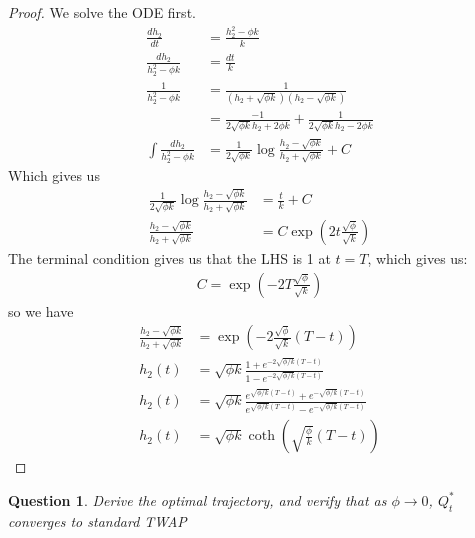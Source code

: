 \documentclass{amsart}
\newtheorem{theorem}{Question}[section]
\begin{document}
\begin{proof}
    We solve the ODE first.
    \begin{align*}
        \frac{dh_2}{dt} &= \frac{h_2^2 - \phi k}{k} \\
        \frac{dh_2}{h_2^2 - \phi k} &= \frac{dt}{k} \\
        \frac{1}{h_2^2 - \phi k} &= \frac1{(h_2 + \sqrt{\phi k})(h_2 - \sqrt{\phi k})} \\
        &= \frac{-1}{2\sqrt{\phi k} h_2 + 2\phi k}  + \frac{1}{2\sqrt{\phi k} h_2 - 2 \phi k} \\
        \int \frac{d h_2}{h_2^2 - \phi k} &= \frac{1}{2\sqrt{\phi k}} \log\frac{h_2 - \sqrt{\phi k}}{h_2 + \sqrt{\phi k}} + C 
    \end{align*}
    Which gives us 
    \begin{align*}
        \frac{1}{2\sqrt{\phi k}} \log\frac{h_2 - \sqrt{\phi k}}{h_2 + \sqrt{\phi k}} &= \frac{t}{k} + C\\
        \frac{h_2 - \sqrt{\phi k}}{h_2 + \sqrt{\phi k}} &= C\exp\left(
            2t\frac{\sqrt{\phi}}{\sqrt{k}}
        \right)
    \end{align*}
    The terminal condition gives us that the LHS is 1 at $t = T$, which gives us: 
    \begin{align*}
        C = \exp\left(
            -2T\frac{\sqrt{\phi}}{\sqrt{k}}
        \right)
    \end{align*}
    so we have 
    \begin{align*}
        \frac{h_2 - \sqrt{\phi k}}{h_2 + \sqrt{\phi k}} &= \exp\left(
            -2\frac{\sqrt{\phi}}{\sqrt{k}}(T - t)
        \right)\\
        h_2(t) &= \sqrt{\phi k} \frac{1 + e^{-2 \sqrt{\phi / k}(T - t)}}{1 - e^{-2 \sqrt{\phi / k}(T - t)}}\\
        h_2(t) &= \sqrt{\phi k} \frac{e^{\sqrt{\phi / k} (T - t)} + e^{-\sqrt{\phi / k} (T - t)}}{e^{\sqrt{\phi / k} (T - t)} - e^{-\sqrt{\phi / k} (T - t)}}\\
        h_2(t) &= \sqrt{\phi k} \coth\left(
            \sqrt{\frac{\phi}{k}} (T - t)
        \right)
    \end{align*}
\end{proof}
\begin{theorem}
    Derive the optimal trajectory, and verify that as $\phi \to 0$, $Q_t^\ast$ converges to standard TWAP
\end{theorem}
\end{document}
